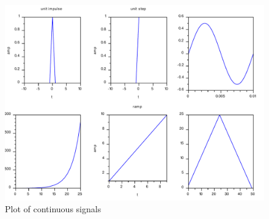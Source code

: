 \begin{figure}
\includegraphics[scale=.5]{scilabCode/continuous.pdf}
\caption{Plot of continuous signals}
\label{continuous}
\end{figure}
